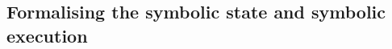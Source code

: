 {%

\subsection{Formalising the symbolic state and symbolic execution}
\label{sec:algorithm-symbolic-execution}


}
